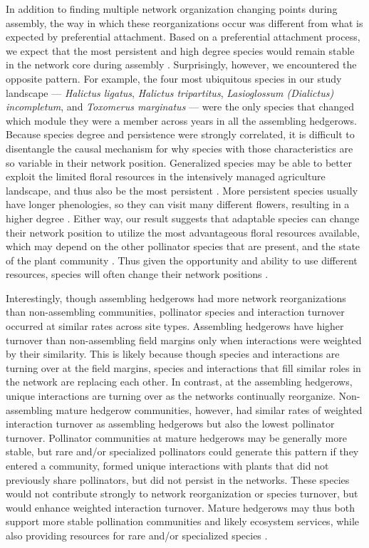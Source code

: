 \documentclass[12pt]{article}
\begin{document}
In addition to finding multiple network organization changing points
during assembly, the way in which these reorganizations occur was
different from what is expected by preferential attachment. Based on a
preferential attachment process, we expect that the most persistent
and high degree species would remain stable in the network core during
assembly \citep{barabasi1999emergence}. Surprisingly, however, we
encountered the opposite pattern. For example, the four most
ubiquitous species in our study landscape --- \textit{Halictus
  ligatus}, \textit{Halictus tripartitus}, \textit{Lasioglossum
  (Dialictus) incompletum}, and \textit{Toxomerus marginatus} --- were
the only species that changed which module they were a member across
years in all the assembling hedgerows. Because species degree and
persistence were strongly correlated, it is difficult to disentangle
the causal mechanism for why species with those characteristics are so
variable in their network position. Generalized species may be able to
better exploit the limited floral resources in the intensively managed
agriculture landscape, and thus also be the most persistent \citep[in
ant-plant mutualisms, ][]{diaz2010changes}. More persistent species
usually have longer phenologies, so they can visit many different
flowers, resulting in a higher degree \citep{Vazquez2009,
  fort2016abundance}. Either way, our result suggests that adaptable
species can change their network position to utilize the most
advantageous floral resources available, which may depend on the other
pollinator species that are present, and the state of the plant
community \citep{macleod2016measuring, gomez2006ecological,
  waser1996generalization}. Thus given the opportunity and ability to
use different resources, species will often change their network
positions \citep{macleod2016measuring}.

Interestingly, though assembling hedgerows had more network
reorganizations than non-assembling communities, pollinator species
and interaction turnover occurred at similar rates across site types.
Assembling hedgerows have higher turnover than non-assembling field
margins only when interactions were weighted by their similarity. This
is likely because though species and interactions are turning over at
the field margins, species and interactions that fill similar roles in
the network are replacing each other. In contrast, at the assembling
hedgerows, unique interactions are turning over as the networks
continually reorganize. Non-assembling mature hedgerow communities,
however, had similar rates of weighted interaction turnover as
assembling hedgerows but also the lowest pollinator
turnover. Pollinator communities at mature hedgerows may be generally
more stable, but rare and/or specialized pollinators could generate
this pattern if they entered a community, formed unique interactions
with plants that did not previously share pollinators, but did not
persist in the networks. These species would not contribute strongly
to network reorganization or species turnover, but would enhance
weighted interaction turnover. Mature hedgerows may thus both support
more stable pollination communities and likely ecosystem services,
while also providing resources for rare and/or specialized species
\citep{kremen-2015-602, mgonigle-2015-x}.
\end{document}
